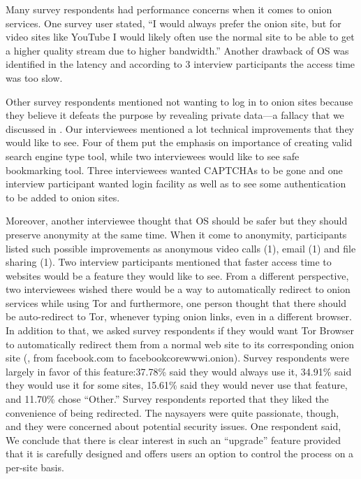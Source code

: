 Many survey respondents had performance concerns when it comes to onion services.   One survey user stated, ``I would
always prefer the onion site, but for video sites like YouTube I would likely
often use the normal site to be able to get a higher quality stream due to
higher bandwidth.'' Another drawback of OS was identified in the latency and according to 3 interview participants the access time was too slow. 

Other survey respondents mentioned not wanting to log in to onion sites
because they believe it defeats the purpose by revealing private data---a fallacy that we discussed in
.  Our interviewees mentioned a lot technical improvements that they would like to see. Four of them put the emphasis on importance of creating valid search engine type tool, while two interviewees would like to see safe bookmarking tool.  Three interviewees wanted CAPTCHAs to be gone and one interview participant wanted login facility as well as to see some authentication to be added to onion sites. 

Moreover, another interviewee thought that OS should be safer but they should preserve anonymity at the same time. When it come to anonymity, participants listed such possible improvements as anonymous video calls (1), email (1) and file sharing (1). Two interview participants mentioned that faster access time to websites would be a feature they would like to see. From a different perspective, two interviewees wished there would be a way to automatically redirect to onion services while using Tor and furthermore, one person thought that there should be auto-redirect to Tor, whenever typing onion links, even in a different browser. In addition to that, we asked survey respondents if they would want Tor Browser to automatically redirect them from
a normal web site to its corresponding onion site (\eg, from facebook.com to
facebookcorewwwi.onion). Survey respondents were largely
in favor of this feature:37.78\% said they would always use it, 34.91\% said
they would use it for some sites, 15.61\% said they would never use that feature,   and
11.70\% chose ``Other.'' Survey respondents reported that they liked the convenience of being redirected.
The naysayers were quite passionate, though, and they were concerned about
potential security issues. One respondent said, 
We conclude that there is clear interest in such an ``upgrade'' feature provided
that it is carefully designed and offers users an option to control the process
on a per-site basis.


